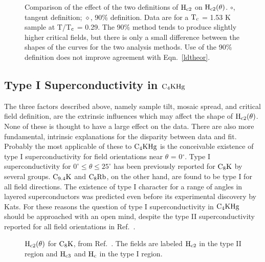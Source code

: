 \begin{figure}
\vspace{4.5in}
\caption[Comparison of the effect of the two definitions of $\rm H_{c2}$ on
$\rm H_{c2}(\theta)$.]{Comparison  of the effect  of the two definitions of
$\rm  H_{c2}$   on $\rm H_{c2}(\theta)$.     $\circ$,  tangent  definition;
$\diamond$, 90\% definition.  Data are for a  $\rm T_c$ =  1.53 K sample at
T/T$\rm  _c$ =  0.29.  The 90\%   method  tends to produce  slightly higher
critical fields, but there is only a small difference between the shapes
of the curves for the two analysis methods.  Use of the 90\% definition
does not improve agreement with Eqn.~\ref{ldtheor}.}
\label{ninety-tangent}
\end{figure}

\subsection{Type I Superconductivity in $\rm C_4KHg$}
\label{typeI}
	The three factors  described   above, namely sample  tilt,   mosaic
spread, and critical field  definition, are  the extrinsic influences which
may affect the shape of $\rm H_{c2}(\theta)$.  None of these is  thought to
have a  large  effect  on  the  data.  There  are   also  more fundamental,
intrinsic explanations for  the disparity between data  and fit.   Probably
the most applicable of these to $\rm C_4KHg $  is the conceivable existence
of   type  I superconductivity  for  field   orientations near   $\theta$ =
0$^{\circ}$.   Type  I superconductivity  for  $0^{\circ}
\leq \theta \leq 25^{\circ}$ has been previously reported for $\rm C_8K$ by
several         groups\cite{kobayashi81a,kobayashi81,koike80}.         $\rm
C_{9.4}K$\cite{kobayashi81a,kobayashi81} and $\rm C_8Rb$\cite{kobayashi85},
on the other hand, are found to be type I for  all field  directions.   The
existence  of  type  I   character for   a    range of  angles   in layered
superconductors  was predicted even   before  its experimental discovery by
Kats.\cite{kats69}  For   these    reasons    the  question   of    type  I
superconductivity in $\rm C_4KHg$ should be approached with  an open mind,
despite  the type II  superconductivity reported for all field orientations
in Ref.~\cite{iye82}.

\begin{figure}
\vspace{10cm} %
\caption[$\rm H_{c2}(\theta)$ for $\rm C_8K$.]{$\rm H_{c2}(\theta)$ for
$\rm C_8K$, from Ref.~\cite{koike80}.  The fields are labeled $\rm H_{c2}$
in the type II region and $\rm H_{c3}$ and $\rm H_c$ in the type I region.  }
\label{Khc2theta}
\end{figure}

